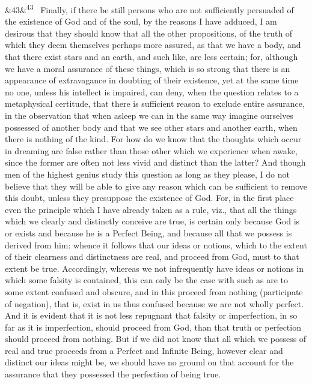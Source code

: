 \documentclass[12pt]{article}
\newcommand{\para}[1][]{\par\noindent\ifx&#1&\else\textsuperscript{\footnotesize #1}~\fi}
\begin{document}
\para[43] Finally, if there be still persons who are not sufficiently persuaded of the existence of God and of the soul, by the reasons I have adduced, I am desirous that they should know that all the other propositions, of the truth of which they deem themselves perhaps more assured, as that we have a body, and that there exist stars and an earth, and such like, are less certain; for, although we have a moral assurance of these things, which is so strong that there is an appearance of extravagance in doubting of their existence, yet at the same time no one, unless his intellect is impaired, can deny, when the question relates to a metaphysical certitude, that there is sufficient reason to exclude entire assurance, in the observation that when asleep we can in the same way imagine ourselves possessed of another body and that we see other stars and another earth, when there is nothing of the kind. For how do we know that the thoughts which occur in dreaming are false rather than those other which we experience when awake, since the former are often not less vivid and distinct than the latter? And though men of the highest genius study this question as long as they please, I do not believe that they will be able to give any reason which can be sufficient to remove this doubt, unless they presuppose the existence of God. For, in the first place even the principle which I have already taken as a rule, viz., that all the things which we clearly and distinctly conceive are true, is certain only because God is or exists and because he is a Perfect Being, and because all that we possess is derived from him: whence it follows that our ideas or notions, which to the extent of their clearness and distinctness are real, and proceed from God, must to that extent be true. Accordingly, whereas we not infrequently have ideas or notions in which some falsity is contained, this can only be the case with such as are to some extent confused and obscure, and in this proceed from nothing (participate of negation), that is, exist in us thus confused because we are not wholly perfect. And it is evident that it is not less repugnant that falsity or imperfection, in so far as it is imperfection, should proceed from God, than that truth or perfection should proceed from nothing. But if we did not know that all which we possess of real and true proceeds from a Perfect and Infinite Being, however clear and distinct our ideas might be, we should have no ground on that account for the assurance that they possessed the perfection of being true.
\end{document}
